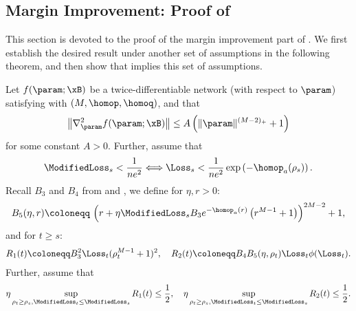 \subsection{Margin Improvement: Proof of \texorpdfstring{}{Theorem 6.1}}\label{sec:margin_improve_gd}
This section is devoted to the proof of the margin improvement part of . We first establish the desired result under another set of assumptions in the following theorem, and then show that  implies this set of assumptions.
\begin{theorem}\label{thm:combined_argument}
    Let $f(\param;\xB)$ be a twice-differentiable network (with respect to $\param$) satisfying  with $(M,\homop, \homoq)$, and that
    \begin{equation*}
        \left\| \nabla_{\param}^2 f(\param; \xB) \right\| \le A \left( \| \param \|^{(M - 2)_+} + 1 \right)
    \end{equation*}
    for some constant $A > 0$. Further, assume that
    \begin{equation}
    \label{eq:init-GD-bound}
        \ModifiedLoss_s < \frac{1}{n e^2} \Longleftrightarrow \Loss_s < \frac{1}{n e^2} \exp \left( - \homop_a (\rho_s) \right).
    \end{equation}
    Recall $B_3$ and $B_4$ from  and , we define for $\eta, r > 0$:
    \begin{equation*}
        B_5 (\eta, r) \coloneqq \, \left( r + \eta \ModifiedLoss_s B_3 e^{-\homop_a(r)} \left( r^{M-1} + 1 \right) \right)^{2M - 2} + 1,
    \end{equation*}
    and for $t \ge s$:
    \begin{align*}
        R_1 (t) \coloneqq B_3^2 \Loss_t (\rho_t^{M - 1} + 1)^2, \quad R_2 (t) \coloneqq B_4 B_5 (\eta, \rho_t) \Loss_t \phi(\Loss_t).
    \end{align*}
    Further, assume that
    \begin{equation*}
        \eta \sup_{\rho_t \ge \rho_s, \ModifiedLoss_t \le \ModifiedLoss_s} R_1 (t) \le \frac{1}{2}, \quad \eta \sup_{\rho_t \ge \rho_s, \ModifiedLoss_t \le \ModifiedLoss_s} R_2 (t)  \le \frac{1}{2}.

\end{equation*}
\end{theorem}
